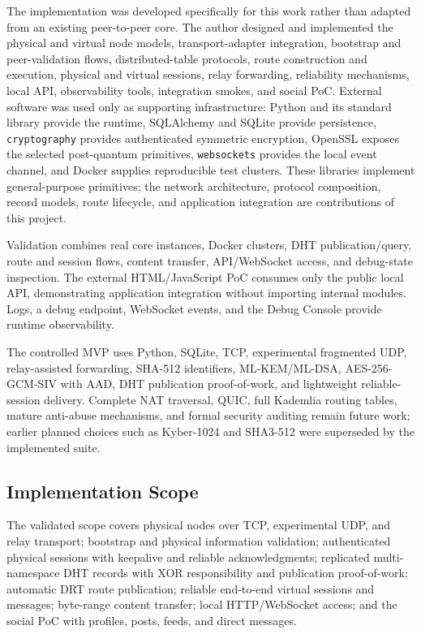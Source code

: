 \documentclass[12pt,a4paper]{article}
\begin{document}
The implementation was developed specifically for this work rather than adapted from an existing peer-to-peer core. The author designed and implemented the physical and virtual node models, transport-adapter integration, bootstrap and peer-validation flows, distributed-table protocols, route construction and execution, physical and virtual sessions, relay forwarding, reliability mechanisms, local API, observability tools, integration smokes, and social PoC. External software was used only as supporting infrastructure: Python and its standard library provide the runtime, SQLAlchemy and SQLite provide persistence, \texttt{cryptography} provides authenticated symmetric encryption, OpenSSL exposes the selected post-quantum primitives, \texttt{websockets} provides the local event channel, and Docker supplies reproducible test clusters. These libraries implement general-purpose primitives; the network architecture, protocol composition, record models, route lifecycle, and application integration are contributions of this project.

Validation combines real core instances, Docker clusters, DHT publication/query, route and session flows, content transfer, API/WebSocket access, and debug-state inspection. The external HTML/JavaScript PoC consumes only the public local API, demonstrating application integration without importing internal modules. Logs, a debug endpoint, WebSocket events, and the Debug Console provide runtime observability.

The controlled MVP uses Python, SQLite, TCP, experimental fragmented UDP, relay-assisted forwarding, SHA-512 identifiers, ML-KEM/ML-DSA, AES-256-GCM-SIV with AAD, DHT publication proof-of-work, and lightweight reliable-session delivery. Complete NAT traversal, QUIC, full Kademlia routing tables, mature anti-abuse mechanisms, and formal security auditing remain future work; earlier planned choices such as Kyber-1024 and SHA3-512 were superseded by the implemented suite.

\subsection{Implementation Scope}
\label{sec:implementation-scope}

The validated scope covers physical nodes over TCP, experimental UDP, and relay transport; bootstrap and physical information validation; authenticated physical sessions with keepalive and reliable acknowledgments; replicated multi-namespace DHT records with XOR responsibility and publication proof-of-work; automatic DRT route publication; reliable end-to-end virtual sessions and messages; byte-range content transfer; local HTTP/WebSocket access; and the social PoC with profiles, posts, feeds, and direct messages.
\end{document}
